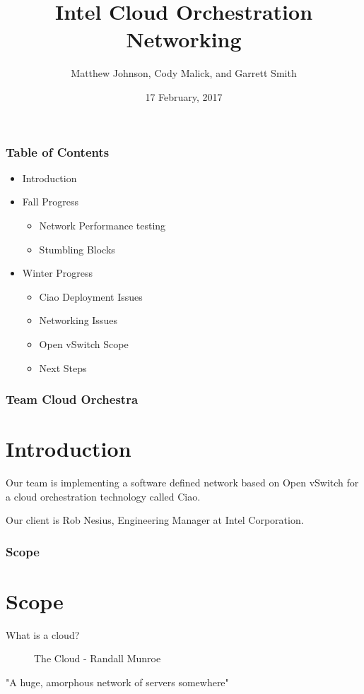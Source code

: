 \documentclass[pdf]{beamer}
\begin{document}
\title{Intel Cloud Orchestration Networking}
\author{Matthew Johnson, Cody Malick, and Garrett Smith}
\date{17 February, 2017}

\maketitle
\begin{frame}
	\frametitle{Table of Contents}
	\begin{itemize}
		\item Introduction
		\item Fall Progress
		\begin{itemize}
			\item Network Performance testing
			\item Stumbling Blocks
		\end{itemize}
		\item Winter Progress
		\begin{itemize}
			\item Ciao Deployment Issues
			\item Networking Issues
			\item Open vSwitch Scope
			\item Next Steps
		\end{itemize}

	\end{itemize}
\end{frame}

\begin{frame}
	\frametitle{Team Cloud Orchestra}
	\section{Introduction}
	Our team is implementing a software defined network based on Open
	vSwitch for a cloud orchestration technology called Ciao.

	Our client is Rob Nesius, Engineering Manager at Intel Corporation.
\end{frame}

\begin{frame}
	\frametitle{Scope}
	\section{Scope}
	What is a cloud?
	\begin{figure}[H]
		\caption{The Cloud - Randall Munroe~\cite{xkcd908}}
		\begin{center}
		\end{center}
	\end{figure}

	"A huge, amorphous network of servers somewhere"

\end{frame}
\end{document}
